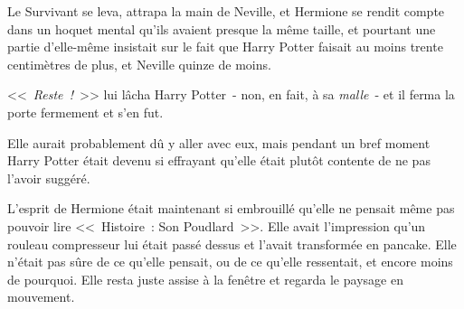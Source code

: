 Le Survivant se leva, attrapa la main de Neville, et Hermione se rendit compte dans un hoquet mental qu'ils avaient presque la même taille, et pourtant une partie d'elle-même insistait sur le fait que Harry Potter faisait au moins trente centimètres de plus, et Neville quinze de moins.

<<~\emph{Reste~!}~>> lui lâcha Harry Potter~- non, en fait, à sa \emph{malle}~- et il ferma la porte fermement et s'en fut.

Elle aurait probablement dû y aller avec eux, mais pendant un bref moment Harry Potter était devenu si effrayant qu'elle était plutôt contente de ne pas l'avoir suggéré.

L'esprit de Hermione était maintenant si embrouillé qu'elle ne pensait même pas pouvoir lire <<~Histoire~: Son Poudlard~>>. Elle avait l'impression qu'un rouleau compresseur lui était passé dessus et l'avait transformée en pancake. Elle n'était pas sûre de ce qu'elle pensait, ou de ce qu'elle ressentait, et encore moins de pourquoi. Elle resta juste assise à la fenêtre et regarda le paysage en mouvement.

